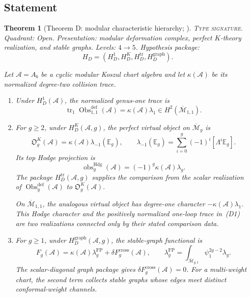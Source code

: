 \documentclass[11pt]{article}
\theoremstyle{plain}
\newtheorem{theorem}{Theorem}[section]
\theoremstyle{definition}
\theoremstyle{remark}
\newcommand{\Mbar}{\overline{\mathcal{M}}}
\newcommand{\cA}{\mathcal{A}}
\begin{document}
\subsection{Statement}

\begin{theorem}[Theorem D: modular characteristic hierarchy;
\ClaimStatusConditional]
\label{thm:genus-universality}
\textsc{Type signature.} Quadrant: Open. Presentation: modular
deformation complex, perfect \(K\)-theory realization, and stable
graphs. Levels: \(4\to5\). Hypothesis package:
\[
 H_D=(H_D^1,H_D^K,H_D^{\mathrm{tr}},H_D^{\mathrm{graph}}).
\]

Let \(\cA=A_b\) be a cyclic modular Koszul chart algebra and let
\(\kappa(\cA)\) be its normalized degree-two collision trace.

\begin{enumerate}[label=\textup{(D\arabic*)}]
\item Under \(H_D^1(\cA)\), the normalized genus-one trace is
\begin{equation}\label{eq:theorem-D-genus-one-standalone}
 \operatorname{tr}_1
 \operatorname{Obs}^{\mathrm{def}}_{1,1}(\cA)
 =\kappa(\cA)\lambda_1
 \in H^2(\Mbar_{1,1}).
\end{equation}

\item For $g\geq2$, under \(H_D^K(\cA,g)\), the perfect virtual
object on \(\Mbar_g\) is
\[
 \mathfrak O_g^K(\cA)
 =\kappa(\cA)\lambda_{-1}(\mathbb E_g),
 \qquad
 \lambda_{-1}(\mathbb E_g)
 =\sum_{i=0}^g(-1)^i[\Lambda^i\mathbb E_g].
\]
Its top Hodge projection is
\begin{equation}\label{eq:theorem-D-hodge-standalone}
 \operatorname{obs}^{\mathrm{Hdg}}_g(\cA)
 =(-1)^g\kappa(\cA)\lambda_g.
\end{equation}
The package \(H_D^{\mathrm{tr}}(\cA,g)\) supplies the comparison
from the scalar realization of
\(\operatorname{Obs}^{\mathrm{def}}_g(\cA)\) to
\(\mathfrak O_g^K(\cA)\).

On \(\Mbar_{1,1}\), the analogous virtual object has degree-one
character \(-\kappa(\cA)\lambda_1\).  This Hodge character and the
positively normalized one-loop trace in~\textup{(D1)} are two
realizations connected only by their stated comparison data.

\item For $g\geq1$, under \(H_D^{\mathrm{graph}}(\cA,g)\), the
stable-graph
functional is
\begin{equation}\label{eq:theorem-D-graph-standalone}
 F_g(\cA)
 =\kappa(\cA)\lambda_g^{\mathrm{FP}}
 +\delta F_g^{\mathrm{cross}}(\cA),
 \qquad
 \lambda_g^{\mathrm{FP}}
 =\int_{\Mbar_{g,1}}\psi_1^{2g-2}\lambda_g.
\end{equation}
The scalar-diagonal graph package gives
\(\delta F_g^{\mathrm{cross}}(\cA)=0\).
For a multi-weight chart, the second term collects stable graphs whose
edges meet distinct conformal-weight channels.
\end{enumerate}
\end{theorem}
\end{document}
